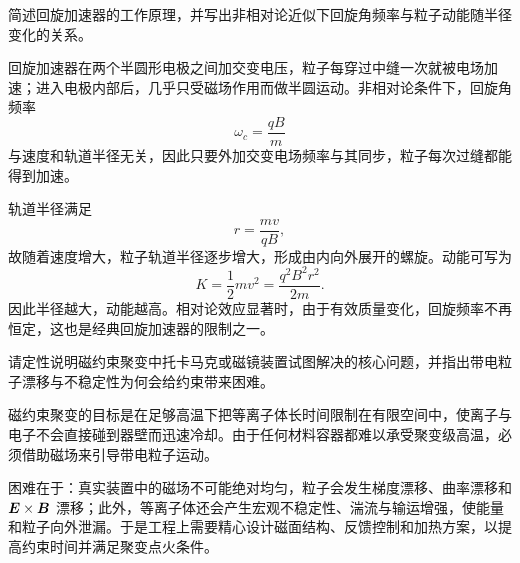 \begin{university}
简述回旋加速器的工作原理，并写出非相对论近似下回旋角频率与粒子动能随半径变化的关系。

\begin{center}
\end{center}

\begin{solution}
回旋加速器在两个半圆形电极之间加交变电压，粒子每穿过中缝一次就被电场加速；进入电极内部后，几乎只受磁场作用而做半圆运动。非相对论条件下，回旋角频率
\[
\omega_c=\frac{qB}{m}
\]
与速度和轨道半径无关，因此只要外加交变电场频率与其同步，粒子每次过缝都能得到加速。

轨道半径满足
\[
r=\frac{mv}{qB},
\]
故随着速度增大，粒子轨道半径逐步增大，形成由内向外展开的螺旋。动能可写为
\[
K=\frac12 mv^2=\frac{q^2B^2r^2}{2m}.
\]
因此半径越大，动能越高。相对论效应显著时，由于有效质量变化，回旋频率不再恒定，这也是经典回旋加速器的限制之一。
\end{solution}
\end{university}

\begin{problem}
请定性说明磁约束聚变中托卡马克或磁镜装置试图解决的核心问题，并指出带电粒子漂移与不稳定性为何会给约束带来困难。

\begin{solution}
磁约束聚变的目标是在足够高温下把等离子体长时间限制在有限空间中，使离子与电子不会直接碰到器壁而迅速冷却。由于任何材料容器都难以承受聚变级高温，必须借助磁场来引导带电粒子运动。

困难在于：真实装置中的磁场不可能绝对均匀，粒子会发生梯度漂移、曲率漂移和 $\vb*{E}\times\vb*{B}$ 漂移；此外，等离子体还会产生宏观不稳定性、湍流与输运增强，使能量和粒子向外泄漏。于是工程上需要精心设计磁面结构、反馈控制和加热方案，以提高约束时间并满足聚变点火条件。
\end{solution}
\end{problem}

